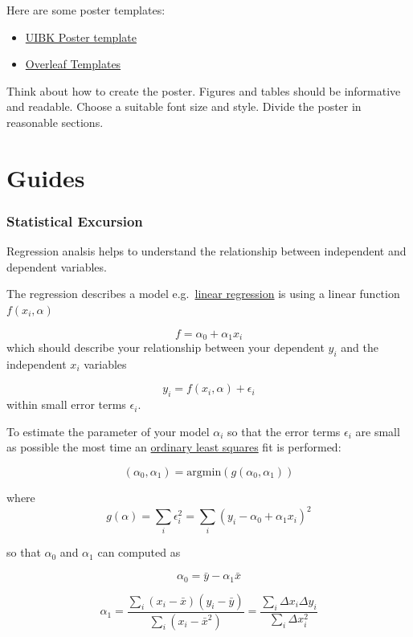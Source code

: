 \documentclass[
  letterpaper,
]{article}
\providecommand{\tightlist}{%
  \setlength{\itemsep}{0pt}\setlength{\parskip}{0pt}}\usepackage{longtable,booktabs,array}
\begin{document}
Here are some poster templates:

\begin{itemize}
\tightlist
\item
  \href{https://www.uibk.ac.at/de/public-relations/services/dokumentvorlagen/}{UIBK
  Poster template}
\item
  \href{https://www.overleaf.com/gallery/tagged/poster}{Overleaf
  Templates}
\end{itemize}

Think about how to create the poster. Figures and tables should be
informative and readable. Choose a suitable font size and style. Divide
the poster in reasonable sections.

\part{Guides}

\hypertarget{statistical-excursion}{%
\section{Statistical Excursion}\label{statistical-excursion}}

Regression analsis helps to understand the relationship between
independent and dependent variables.

The regression describes a model
e.g.~\href{https://en.wikipedia.org/wiki/Simple_linear_regression}{linear
regression} is using a linear function \(f(x_i,\alpha)\)

\[
f = \alpha_{0} + \alpha_{1} x_i
\] which should describe your relationship between your dependent
\(y_i\) and the independent \(x_i\) variables

\[
y_i = f(x_i,\alpha) + \epsilon_i
\] within small error terms \(\epsilon_i\).

To estimate the parameter of your model \(\alpha_i\) so that the error
terms \(\epsilon_i\) are small as possible the most time an
\href{https://en.wikipedia.org/wiki/Ordinary_least_squares}{ordinary
least squares} fit is performed:

\[
(\alpha_0,\alpha_1) = \mathrm{argmin}(g(\alpha_0, \alpha_1))
\]

where \[
g(\alpha) = \sum_i \epsilon_i^2 = \sum_i (y_i - \alpha_0 + \alpha_1 x_i)^2
\]

so that \(\alpha_0\) and \(\alpha_1\) can computed as

\[
\alpha_0 = \bar{y} -\alpha_1 \bar{x}
\]

\[
\alpha_1 = \frac{\sum_i (x_i - \bar{x})(y_i - \bar{y})}{\sum_i (x_i - \bar{x}^2)} = \frac{\sum_i \Delta x_i \Delta y_i}{\sum_i \Delta x_i^2}
\]
\end{document}
